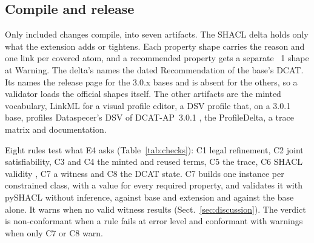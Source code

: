 \subsection{Compile and release}\label{sec:compile}

Only included changes compile, into seven artifacts. The \ac{SHACL} delta holds only what the extension adds or %
tightens. Each property shape carries the reason and one  link per covered atom, and %
a recommended property gets a separate ~1 shape at Warning. The delta's
 names the dated Recommendation of the base's \acs{DCAT}. Its  %
names the release page for the 3.0.x bases and is absent for the others, so a validator loads the official %
shapes itself. The other artifacts are the minted vocabulary, \ac{LinkML} \cite{moxon2026linkml} for a visual profile editor, a \ac{DSV} profile \cite{klimek2026dsv} that, on a 3.0.1 base, profiles %
Dataspecer's \acs{DSV} of \acs{DCAT-AP}~3.0.1 \cite{klimek2024dataspecer}, the ProfileDelta, a trace matrix and documentation.

Eight rules test what E4 asks (Table~\ref{tab:checks}): C1 legal refinement, C2 joint satisfiability, C3 %
and C4 the minted and reused terms, C5 the trace, C6 \acs{SHACL} validity \cite{w3cshacl}, C7 a witness and C8 %
the \acs{DCAT} state. C7 builds one instance per constrained class, with a value for every required property, %
and validates it with pySHACL \cite{sommer2026pyshacl} without inference, against base and extension and against
the base alone. It warns when no valid witness results (Sect.~\ref{sec:discussion}). The verdict is %
non-conformant when a rule fails at error level and conformant with warnings when only C7 or C8 warn.

